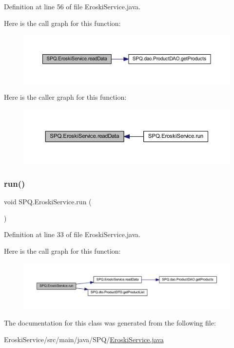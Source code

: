 Definition at line 56 of file Eroski\+Service.\+java.

Here is the call graph for this function\+:
\nopagebreak
\begin{figure}[H]
\begin{center}
\leavevmode
\includegraphics[width=350pt]{class_s_p_q_1_1_eroski_service_a89fa3f97cdca647e3c6d6606e5dc2443_cgraph}
\end{center}
\end{figure}
Here is the caller graph for this function\+:
\nopagebreak
\begin{figure}[H]
\begin{center}
\leavevmode
\includegraphics[width=350pt]{class_s_p_q_1_1_eroski_service_a89fa3f97cdca647e3c6d6606e5dc2443_icgraph}
\end{center}
\end{figure}
\mbox{\label{class_s_p_q_1_1_eroski_service_abacda123f2febc1eb7c2825eb4e46c37}} 
\subsubsection{\texorpdfstring{run()}{run()}}
{\footnotesize\ttfamily void S\+P\+Q.\+Eroski\+Service.\+run (\begin{DoxyParamCaption}{ }\end{DoxyParamCaption})}



Definition at line 33 of file Eroski\+Service.\+java.

Here is the call graph for this function\+:
\nopagebreak
\begin{figure}[H]
\begin{center}
\leavevmode
\includegraphics[width=350pt]{class_s_p_q_1_1_eroski_service_abacda123f2febc1eb7c2825eb4e46c37_cgraph}
\end{center}
\end{figure}


The documentation for this class was generated from the following file\+:\begin{DoxyCompactItemize}
\item 
Eroski\+Service/src/main/java/\+S\+P\+Q/\mbox{\hyperlink{_eroski_service_8java}{Eroski\+Service.\+java}}\end{DoxyCompactItemize}
